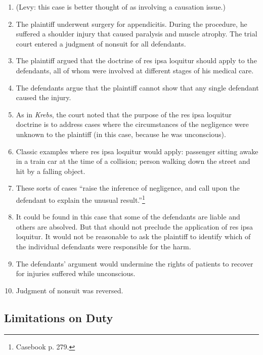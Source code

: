 \begin{enumerate}
    \item (Levy: this case is better thought of as involving a causation 
    issue.)
    \item The plaintiff underwent surgery for appendicitis. During the 
    procedure, he suffered a shoulder injury that caused paralysis and muscle 
    atrophy. The trial court entered a judgment of nonsuit for all defendants.
    \item The plaintiff argued that the doctrine of res ipsa loquitur should 
    apply to the defendants, all of whom were involved at different stages of 
    his medical care.
    \item The defendants argue that the plaintiff cannot show that any single 
    defendant caused the injury.
    \item As in \emph{Krebs}, the court noted that the purpose of the res ipsa 
    loquitur doctrine is to address cases where the circumstances of the 
    negligence were unknown to the plaintiff (in this case, because he was 
    unconscious).
    \item Classic examples where res ipsa loquitur would apply: passenger 
    sitting awake in a train car at the time of a collision; person walking 
    down the street and hit by a falling object.
    \item These sorts of cases ``raise the inference of negligence, and call 
    upon the defendant to explain the unusual result.''\footnote{Casebook p. 
    279.}
    \item It could be found in this case that some of the defendants are 
    liable and others are absolved. But that should not preclude the 
    application of res ipsa loquitur. It would not be reasonable to ask the 
    plaintiff to identify which of the individual defendants were responsible 
    for the harm.
    \item The defendants' argument would undermine the rights of patients to 
    recover for injuries suffered while unconscious.
    \item Judgment of nonsuit was reversed.
\end{enumerate}

\subsection{Limitations on Duty}

